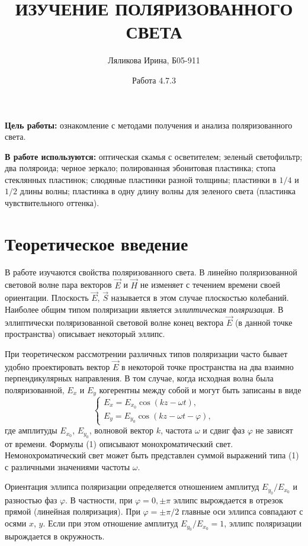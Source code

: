 \documentclass[a4paper,12pt]{article}
\title{ИЗУЧЕНИЕ ПОЛЯРИЗОВАННОГО СВЕТА}
\date{Работа 4.7.3}
\author{Ляликова Ирина, Б05-911}
\begin{document}
		\vspace{0.5 cm}
	\maketitle
	\vspace{0.5 cm}
	
	\textbf{Цель работы:} ознакомление с методами получения и анализа поляризованного света.
	
	\textbf{В работе используются:} оптическая скамья с осветителем; зеленый светофильтр; два поляроида; черное зеркало; полированная эбонитовая пластинка; стопа стеклянных пластинок; слюдяные пластинки разной толщины; пластинки в $1/4$ и $1/2$ длины волны; пластинка в одну длину волны для зеленого света (пластинка чувствительного оттенка).
	
	\section*{Теоретическое введение}
	В работе изучаются свойства поляризованного света. В линейно поляризованной световой волне пара векторов $\vec{E}$ и $\vec{H}$ не изменяет с течением времени своей ориентации. Плоскость $\vec{E}$, $\vec{S}$ называется в этом случае плоскостью колебаний. Наиболее общим типом поляризации является \textit{эллиптическая поляризация}. В эллиптически поляризованной световой волне конец вектора $\vec{E}$ (в данной точке пространства) описывает некоторый эллипс.
	
	При теоретическом рассмотрении различных типов поляризации часто бывает удобно проектировать вектор $\vec{E}$ в некоторой точке пространства на два взаимно перпендикулярных направления. В том случае, когда исходная волна была поляризованной, $E_x$ и $E_y$ когерентны между собой и могут быть записаны в виде
	\begin{equation}
	\begin{cases}
	E_x = E_{x_0}\cos(kz - \omega t),\\
	E_y = E_{y_0}\cos(kz - \omega t-\varphi),
	\end{cases}
	\end{equation}
	где амплитуды $E_{x_0}$, $E_{y_0}$, волновой вектор $k$, частота $\omega$ и сдвиг фаз $\varphi$ не зависят от времени. Формулы (1) описывают монохроматический свет. Немонохроматический свет может быть представлен суммой выражений типа (1) с различными значениями частоты $\omega$.
	
	Ориентация эллипса поляризации определяется отношением амплитуд $E_{y_0}/E_{x_0}$ и разностью фаз $\varphi$. В частности, при $\varphi = 0, \pm\pi$ эллипс вырождается в отрезок прямой (линейная поляризация). При $\varphi = \pm\pi/2$ главные оси эллипса совпадают с осями $x$, $y$. Если при этом отношение амплитуд $E_{y_0}/E_{x_0} = 1$, эллипс поляризации вырождается в окружность.	
	
\end{document}
